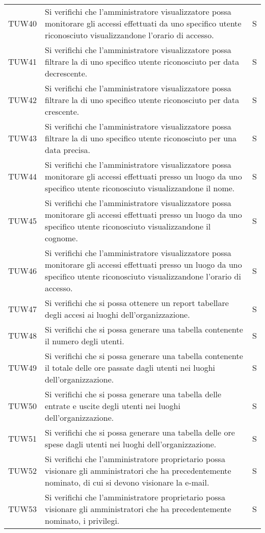 {\begin{longtable}{ c C{13cm} C{1cm}}
TUW40 & Si verifichi che l’amministratore visualizzatore possa monitorare gli accessi effettuati da uno specifico utente riconosciuto visualizzandone l’orario di accesso. & S \\
TUW41 & Si verifichi che l’amministratore visualizzatore possa filtrare la  di uno specifico utente riconosciuto per data decrescente. & S \\
TUW42 & Si verifichi che l’amministratore visualizzatore possa filtrare la  di uno specifico utente riconosciuto per data crescente. & S \\
TUW43 & Si verifichi che l’amministratore visualizzatore possa filtrare la  di uno specifico utente riconosciuto per una data precisa. & S \\
TUW44 & Si verifichi che l’amministratore visualizzatore possa monitorare gli accessi effettuati presso un luogo da uno specifico utente riconosciuto visualizzandone il nome. & S \\
TUW45 & Si verifichi che l’amministratore visualizzatore possa monitorare gli accessi effettuati presso un luogo da uno specifico utente riconosciuto visualizzandone il cognome. & S \\
TUW46 & Si verifichi che l’amministratore visualizzatore possa monitorare gli accessi effettuati presso un luogo da uno specifico utente riconosciuto visualizzandone l’orario di accesso. & S \\
TUW47 & Si verifichi che si possa ottenere un report tabellare degli accesi ai luoghi dell'organizzazione. & S \\
TUW48 & Si verifichi che si possa generare una tabella contenente il numero degli utenti. & S \\
TUW49 & Si verifichi che si possa generare una tabella contenente il totale delle ore passate dagli utenti nei luoghi dell’organizzazione. & S \\
TUW50 & Si verifichi che si possa generare una tabella delle entrate e uscite degli utenti nei luoghi dell'organizzazione. & S \\
TUW51 & Si verifichi che si possa generare una tabella delle ore spese dagli utenti nei luoghi dell'organizzazione. & S \\
TUW52 & Si verifichi che l’amministratore proprietario possa visionare gli amministratori che ha precedentemente nominato, di cui si devono visionare la e-mail. & S \\
TUW53 & Si verifichi che l’amministratore proprietario possa visionare gli amministratori che ha precedentemente nominato, i privilegi. & S \\

\end{longtable}}
